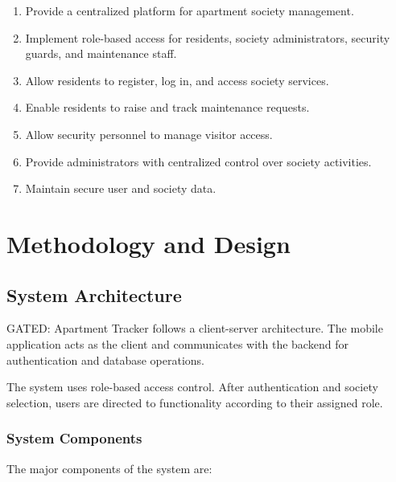 \documentclass{tietreport}
\begin{document}
\begin{enumerate}
    \item Provide a centralized platform for apartment
    society management.

    \item Implement role-based access for residents,
    society administrators, security guards, and
    maintenance staff.

    \item Allow residents to register, log in, and
    access society services.

    \item Enable residents to raise and track
    maintenance requests.

    \item Allow security personnel to manage visitor
    access.

    \item Provide administrators with centralized
    control over society activities.

    \item Maintain secure user and society data.
\end{enumerate}


\chapter{Methodology and Design}

\section{System Architecture}

GATED: Apartment Tracker follows a client-server
architecture. The mobile application acts as the client
and communicates with the backend for authentication and
database operations.

The system uses role-based access control. After
authentication and society selection, users are directed
to functionality according to their assigned role.

\subsection{System Components}

The major components of the system are:
\end{document}
